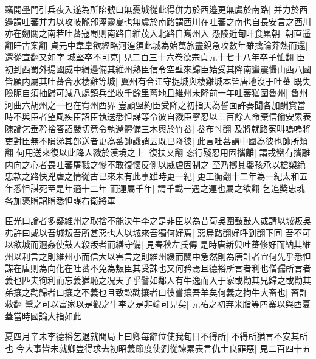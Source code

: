 竊開壘門引兵夜入遂為所陷號曰無憂城從此得併力於西邉更無虞於南路|{
	并力於西邉謂吐蕃并力以攻岐隴邠涇靈夏也無虞於南路謂西川在吐蕃之南也自長安言之西川亦在劒關之南若吐蕃寇蜀則南路自維茂入北路自嶲州入}
憑陵近甸旰食累朝|{
	朝直遥翻旰古案翻}
貞元中韋臯欲經略河湟須此城為始萬旅盡銳急攻數年雖擒論莽熱而還|{
	還從宣翻又如字}
城堅卒不可克|{
	見二百三十六卷德宗貞元十七十八年卒子恤翻}
臣初到西蜀外揚國威中緝邊備其維州熟臣信令空壁來歸臣始受其降南蠻震懾山西八國皆願内屬其吐蕃合水棲雞等城|{
	翼州有合江守捉城與棲雞城本皆唐地沒于吐蕃}
既失險阨自須抽歸可減八處鎮兵坐收千餘里舊地且維州未降前一年吐蕃猶圍魯州|{
	魯州河曲六胡州之一也在宥州西界}
豈顧盟約臣受降之初指天為誓面許奏聞各加酬賞當時不與臣者望風疾臣詔臣執送悉怛謀等令彼自戮臣寧忍以三百餘人命棄信偷安累表陳論乞垂矜捨答詔嚴切竟令執還體備三木輿於竹畚|{
	畚布忖翻}
及將就路寃叫嗚嗚將吏對臣無不隕涕其部送者更為蕃帥譏誚云既已降彼|{
	此言吐蕃謂中國為彼也帥所類翻}
何用送來復以此降人戮於漢境之上|{
	復扶又翻}
恣行殘忍用固攜離|{
	謂戎蠻有攜離内向之心者畏吐蕃屠戮之慘不敢復懷反側以威虐固制之}
至乃擲其嬰孩承以槍槊絶忠款之路快兇虐之情從古已來未有此事雖時更一紀|{
	更工衡翻十二年為一紀太和五年悉怛謀死至是年適十二年}
而運屬千年|{
	謂千載一遇之運也屬之欲翻}
乞追奬忠魂各加褒贈詔贈悉怛謀右衛將軍

臣光曰論者多疑維州之取捨不能決牛李之是非臣以為昔荀吳圍鼓鼓人或請以城叛吳弗許曰或以吾城叛吾所甚惡也人以城來吾獨何好焉|{
	惡烏路翻好呼到翻下同}
吾不可以欲城而邇姦使鼓人殺叛者而繕守備|{
	見春秋左氏傳}
是時唐新與吐蕃修好而納其維州以利言之則維州小而信大以害言之則維州緩而關中急然則為唐計者宜何先乎悉怛謀在唐則為向化在吐蕃不免為叛臣其受誅也又何矜焉且德裕所言者利也僧孺所言者義也匹夫徇利而忘義猶恥之况天子乎譬如鄰人有牛逸而入于家或勸其兄歸之或勸其弟攘之勸歸者曰攘之不義也且致訟勸攘者曰彼嘗攘吾羊矣何義之拘牛大畜也|{
	畜許救翻}
鬻之可以富家以是觀之牛李之是非端可見矣|{
	元祐之初弃米脂等四寨以與西夏蓋當時國論大指如此}


夏四月辛未李德裕乞退就閒局上曰卿每辭位使我旬日不得所|{
	不得所猶言不安其所也}
今大事皆未就卿豈得求去初昭義節度使劉從諫累表言仇士良罪惡|{
	見二百四十五}


